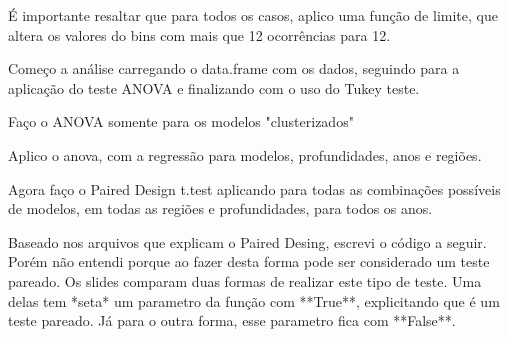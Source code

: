 É importante resaltar que para todos os casos, aplico uma função de limite, que altera os valores do bins com mais que 12 ocorrências para 12.

Começo a análise carregando o data.frame com os dados, seguindo para a aplicação do teste ANOVA e finalizando com o uso do Tukey teste.


Faço o ANOVA somente para os modelos "clusterizados"

Aplico o anova, com a regressão para modelos, profundidades, anos e regiões.

Agora faço o Paired Design t.test aplicando para todas as combinações possíveis de modelos, em todas as regiões e profundidades, para todos os anos.

Baseado nos arquivos que explicam o Paired Desing, escrevi o código a seguir. Porém não entendi porque ao fazer desta forma pode ser considerado um teste pareado. Os slides comparam duas formas de realizar este tipo de teste. Uma delas tem 
*seta* um parametro da função com **True**, explicitando que é um teste pareado. Já para o outra forma, esse parametro fica com **False**.

%

